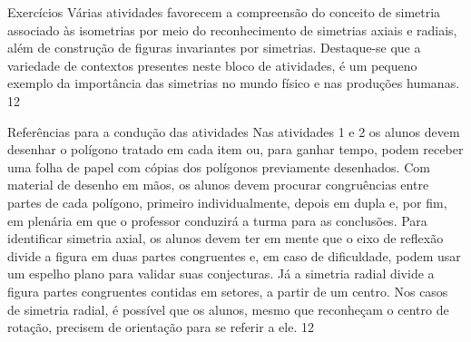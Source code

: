 \clearpage
\def\currentcolor{cor1}

\marginpar{\vspace{-1em}}
\begin{objectives}{Exercícios}
{
 Várias atividades favorecem a compreensão do conceito de simetria associado às isometrias por meio do reconhecimento de simetrias axiais e radiais, além de construção de figuras invariantes por simetrias. Destaque-se que a variedade de contextos presentes neste bloco de atividades, é um pequeno exemplo da importância das simetrias no mundo físico e nas produções humanas.
}{1}{2}
\end{objectives}
\begin{sugestions}{Referências para a condução das atividades}
{
Nas atividades 1 e 2 os alunos devem desenhar o polígono tratado em cada item ou, para ganhar tempo, podem receber uma folha de papel com cópias dos polígonos previamente desenhados. Com material de desenho em mãos, os alunos devem procurar congruências entre partes de cada polígono, primeiro individualmente, depois em dupla e, por fim, em plenária em que o professor conduzirá a turma para as conclusões. Para identificar simetria axial, os alunos devem ter em mente que o eixo de reflexão divide a figura em duas partes congruentes e, em caso de dificuldade, podem usar um espelho plano para validar suas conjecturas. Já a simetria radial divide a figura partes congruentes contidas em setores, a partir de um centro.  Nos casos de simetria radial, é possível que os alunos, mesmo que reconheçam o centro de rotação, precisem de orientação para se referir a ele. 
}{1}{2}
\end{sugestions}
